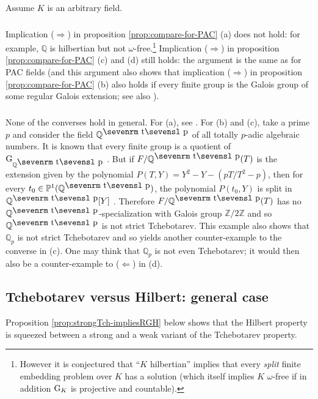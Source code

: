 \documentclass[12pt,english]{amsart}
\newtheorem{twisting lemma}[theorem]{Twisting lemma}
\begin{document}
Assume $K$ is an arbitrary field. 

\subsubsection{}
Implication ($\Rightarrow$) in proposition \ref{prop:compare-for-PAC} (a) does not hold: for example, ${\mathbb{Q}}$
 is hilbertian but not $\omega$-free.\footnote{However it is conjectured that ``$K$ hilbertian'' implies that every {\it split} finite embedding problem over $K$ has a solution \cite{DeDes1} (which itself implies $K$ $\omega$-free if in addition ${\hbox{\rm G}}_K$ is projective and countable).}  Implication ($\Rightarrow$)  in proposition \ref{prop:compare-for-PAC} (c) and (d) still holds: the argument is the same as for PAC fields (and this argument also shows that implication ($\Rightarrow$) in proposition \ref{prop:compare-for-PAC} (b) also holds if every finite 
group is the Galois group of some regular Galois extension; see also \cite[\S 3.3.2]{DeBB}).

\subsubsection{} None of the converses hold in general. For (a), see \cite[remark 2.14]{Bary-Soroker-Paran}. 
For (b) and (c), take a prime $p$ and consider the field ${\mathbb{Q}}^{{\hbox{\sevenrm t\sevensl p}}}$ of all totally $p$-adic algebraic numbers. It is known that every finite 
group is a quotient of ${\hbox{\rm G}}_{{\mathbb{Q}}^{{\hbox{\sevenrm t\sevensl p}}}}$ \cite{efrat}. But if $F/{\mathbb{Q}}^{{\hbox{\sevenrm t\sevensl p}}}(T)$ is the extension given by the polynomial $P(T,Y)= Y^2-Y - (pT/T^2-p)$, then for every $t_0\in {\mathbb{P}}^1({\mathbb{Q}}^{{\hbox{\sevenrm t\sevensl p}}})$, the polynomial $P(t_0,Y)$ is split in ${\mathbb{Q}}^{{\hbox{\sevenrm t\sevensl p}}}[Y]$ \cite[example 5.2]{DeHa}. Therefore $F/{\mathbb{Q}}^{{\hbox{\sevenrm t\sevensl p}}}(T)$ has no ${\mathbb{Q}}^{{\hbox{\sevenrm t\sevensl p}}}$-specialization with Galois group ${\mathbb{Z}}/2{\mathbb{Z}}$ and so ${\mathbb{Q}}^{{\hbox{\sevenrm t\sevensl p}}}$ is not strict Tchebotarev. This example also shows that ${\mathbb{Q}}_p$ is not strict Tchebotarev and so yields another counter-example to the converse in (c).
One may think that ${\mathbb{Q}}_p$ is not even Tchebotarev; it would then also be a counter-example to ($\Leftarrow$) in (d).

\subsection{Tchebotarev versus Hilbert: general case} 
Proposition \ref{prop:strongTch-impliesRGH} below shows that the Hilbert property is squeezed between a strong and a weak variant of the Tchebotarev property.
\end{document}
